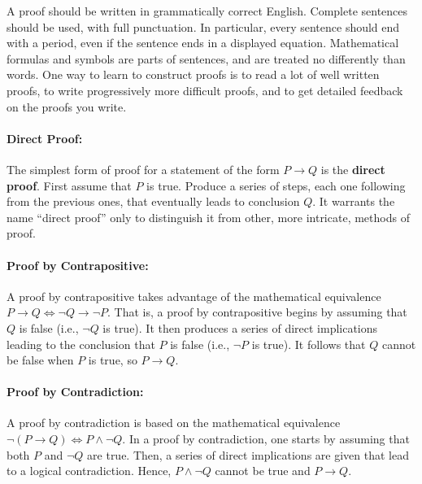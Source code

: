 A proof should be written in grammatically correct English.
Complete sentences should be used, with full punctuation.
In particular, every sentence should end with a period, even if the sentence ends in a displayed equation.
Mathematical formulas and symbols are parts of sentences, and are treated no differently than words.
One way to learn to construct proofs is to read a lot of well written proofs, to write progressively more difficult proofs, and to get detailed feedback on the proofs you write.


\paragraph{Direct Proof:}

The simplest form of proof for a statement of the form $P \rightarrow Q$ is the \textbf{direct proof}.
First assume that $P$ is true.
Produce a series of steps, each one following from the previous ones, that eventually leads to conclusion $Q$.
It warrants the name ``direct proof'' only to distinguish it from other, more intricate, methods of proof.

\paragraph{Proof by Contrapositive:}
A proof by contrapositive takes advantage of the mathematical equivalence $P \rightarrow Q \Leftrightarrow \neg Q \rightarrow \neg P$.
That is, a proof by contrapositive begins by assuming that $Q$ is false (i.e., $\neg Q$ is true).
It then produces a series of direct implications leading to the conclusion that $P$ is false (i.e., $\neg P$ is true).
It follows that $Q$ cannot be false when $P$ is true, so $P \rightarrow Q$.

\paragraph{Proof by Contradiction:}
A proof by contradiction is based on the mathematical equivalence $\neg (P \rightarrow Q) \Leftrightarrow P \wedge \neg Q$.
In a proof by contradiction, one starts by assuming that both $P$ and $\neg Q$ are true.
Then, a series of direct implications are given that lead to a logical contradiction.
Hence, $P \wedge \neg Q$ cannot be true and $P \rightarrow Q$.


